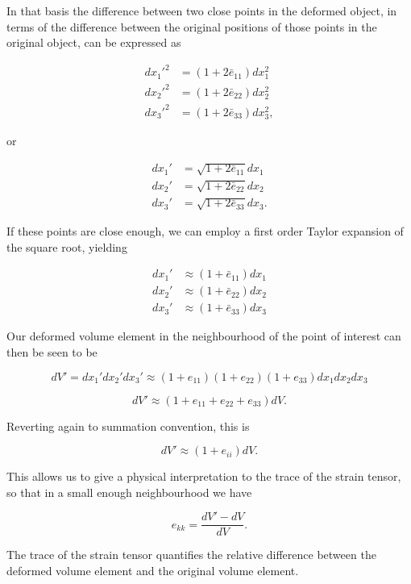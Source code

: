 In that basis the difference between two close points in the deformed object, in terms of the difference between the original positions of those points in the original object, can be expressed as

\begin{align}\label{eqn:continuumL2:270}
{dx_1'}^2 &= (1 + 2 \bar{e}_{11}) dx_1^2 \\
{dx_2'}^2 &= (1 + 2 \bar{e}_{22}) dx_2^2 \\
{dx_3'}^2 &= (1 + 2 \bar{e}_{33}) dx_3^2,
\end{align}

or

\begin{align}\label{eqn:continuumL2:280}
dx_1' &= \sqrt{1 + 2 \bar{e}_{11}} dx_1 \\
dx_2' &= \sqrt{1 + 2 \bar{e}_{22}} dx_2 \\
dx_3' &= \sqrt{1 + 2 \bar{e}_{33}} dx_3.
\end{align}

If these points are close enough, we can employ a first order Taylor expansion of the square root, yielding

\begin{align}\label{eqn:continuumL2:290}
dx_1' &\approx (1 + \bar{e}_{11}) dx_1 \\
dx_2' &\approx (1 + \bar{e}_{22}) dx_2 \\
dx_3' &\approx (1 + \bar{e}_{33}) dx_3
\end{align}

Our deformed volume element in the neighbourhood of the point of interest can then be seen to be

\begin{equation}\label{eqn:continuumL2:310}
dV' =
dx_1'
dx_2'
dx_3'
\approx
(1 + e_{11})
(1 + e_{22})
(1 + e_{33})
dx_1 dx_2 dx_3
\end{equation}

\begin{equation}\label{eqn:continuumL2:330}
dV' \approx (1 + e_{11} +e_{22} +e_{33} ) dV.
\end{equation}

Reverting again to summation convention, this is

\begin{equation}\label{eqn:continuumL2:350}
dV' \approx ( 1 + e_{ii} ) dV.
\end{equation}

This allows us to give a physical interpretation to the trace of the strain tensor, so that in a small enough neighbourhood we have

\begin{equation}\label{eqn:continuumElasticityReview:190}
e_{kk} = \frac{dV' - dV}{dV}.
\end{equation}

The trace of the strain tensor quantifies the relative difference between the deformed volume element and the original volume element.
